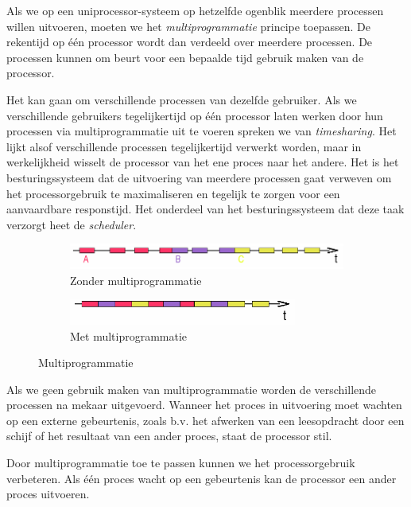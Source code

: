 Als we op een uniprocessor-systeem op hetzelfde ogenblik
meerdere processen willen uitvoeren, moeten we het
\emph{multiprogrammatie} principe toepassen. De
rekentijd op \'e\'en processor wordt dan verdeeld over meerdere processen.
De processen kunnen om beurt voor een bepaalde tijd gebruik maken van
de processor.

Het kan gaan om verschillende processen van dezelfde gebruiker.
Als we verschillende gebruikers tegelijkertijd op \'e\'en processor laten
werken door hun processen via multiprogrammatie uit te voeren spreken
we van \emph{timesharing}. Het lijkt alsof
verschillende processen tegelijkertijd verwerkt worden, maar in
werkelijkheid wisselt de processor van het ene proces naar het andere.
Het is het besturingssysteem dat de uitvoering van meerdere processen
gaat verweven om het processorgebruik te maximaliseren en tegelijk te
zorgen voor een aanvaardbare responstijd. Het onderdeel van het
besturingssysteem dat deze taak verzorgt heet de
\emph{scheduler}.

\begin{figure}
\centering
\begin{subfigure}{.5\textwidth}
  \centering
  \includegraphics[width=100mm]{images/fig0501a.png}
  \caption{Zonder multiprogrammatie}
  \label{multprogr:a}
\end{subfigure}%
\begin{subfigure}{.5\textwidth}
  \centering
  \includegraphics[width=75mm]{images/fig0501b.png}
  \caption{Met multiprogrammatie}
  \label{multprogr:b}
\end{subfigure}
\caption{Multiprogrammatie}
\label{multprogr}
\end{figure}

Als we geen gebruik maken van multiprogrammatie worden de
verschillende processen na mekaar uitgevoerd. Wanneer het proces in
uitvoering moet wachten op een externe gebeurtenis, zoals b.v. het
afwerken van een leesopdracht door een schijf of het resultaat van een
ander proces, staat de processor stil.

Door multiprogrammatie toe te passen kunnen we het
processorgebruik verbeteren. Als \'e\'en proces wacht op een gebeurtenis
kan de processor een ander proces uitvoeren.

